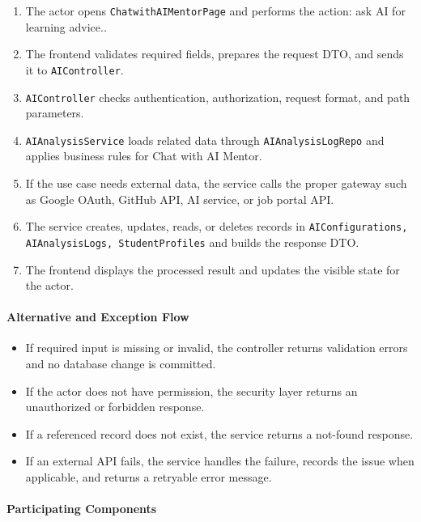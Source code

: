 \begin{enumerate}
    \item The actor opens \texttt{ChatwithAIMentorPage} and performs the action: ask AI for learning advice..
    \item The frontend validates required fields, prepares the request DTO, and sends it to \texttt{AIController}.
    \item \texttt{AIController} checks authentication, authorization, request format, and path parameters.
    \item \texttt{AIAnalysisService} loads related data through \texttt{AIAnalysisLogRepo} and applies business rules for Chat with AI Mentor.
    \item If the use case needs external data, the service calls the proper gateway such as Google OAuth, GitHub API, AI service, or job portal API.
    \item The service creates, updates, reads, or deletes records in \texttt{AIConfigurations, AIAnalysisLogs, StudentProfiles} and builds the response DTO.
    \item The frontend displays the processed result and updates the visible state for the actor.
\end{enumerate}

\paragraph{Alternative and Exception Flow}

\begin{itemize}
    \item If required input is missing or invalid, the controller returns validation errors and no database change is committed.
    \item If the actor does not have permission, the security layer returns an unauthorized or forbidden response.
    \item If a referenced record does not exist, the service returns a not-found response.
    \item If an external API fails, the service handles the failure, records the issue when applicable, and returns a retryable error message.
\end{itemize}

\paragraph{Participating Components}

